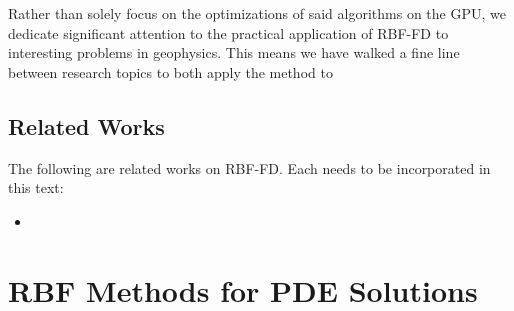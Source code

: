 \documentclass{report}
\begin{document}
{Rather than solely focus on the optimizations of said algorithms on the GPU, we dedicate significant attention to the practical application of RBF-FD to interesting problems in geophysics. This means we have walked a fine line between research topics to both apply the method to 

\section{Related Works}

The following are related works on RBF-FD. Each needs to be incorporated in this text: 

\begin{itemize} 
\item 
\end{itemize}



\chapter{RBF Methods for PDE Solutions} 

%
%
%




}
\end{document}
